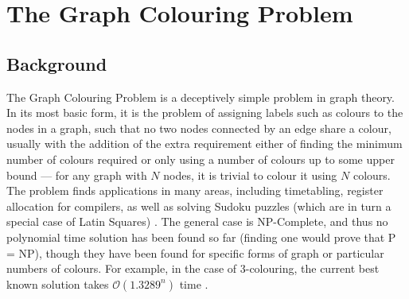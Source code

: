 \newcommand{\bo}{\(b\)}

\chapter{\label{chap:gcol}The Graph Colouring Problem}

\section{\label{sec:gcol:background}Background}

The Graph Colouring Problem is a deceptively simple problem in graph theory.  In its most basic form, it is the problem of assigning labels such as colours to the nodes in a graph, such that no two nodes connected by an edge share a colour, usually with the addition of the extra requirement either of finding the minimum number of colours required or only using a number of colours up to some upper bound --- for any graph with \(N\) nodes, it is trivial to colour it using \(N\) colours.  The problem finds applications in many areas, including timetabling, register allocation for compilers, as well as solving Sudoku puzzles (which are in turn a special case of Latin Squares) \cite{Lewis2016}.  The general case is NP-Complete, and thus no polynomial time solution has been found so far (finding one would prove that P = NP), though they have been found for specific forms of graph or particular numbers of colours.  For example, in the case of 3-colouring, the current best known solution takes \(\mathcal{O}(1.3289^n)\) time \cite{Beigel2005}.



